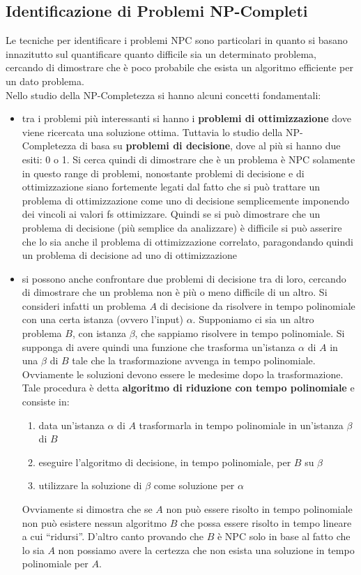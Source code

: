 \documentclass[a4paper,12pt, oneside]{book}
\begin{document}
\subsection{Identificazione di Problemi NP-Completi}
Le tecniche per identificare i problemi NPC sono particolari in quanto
si basano innazitutto sul quantificare quanto difficile sia un
determinato problema, cercando di dimostrare che è poco probabile che
esista un algoritmo efficiente per un dato problema. \\
Nello studio della NP-Completezza si hanno alcuni concetti
fondamentali:
\begin{itemize}
  \item tra i problemi più interessanti si hanno i \textbf{problemi di
    ottimizzazione} dove viene ricercata una soluzione ottima. Tuttavia
  lo studio della NP-Completezza di basa su \textbf{problemi di
    decisione}, dove al più si hanno due esiti: 0 o 1. Si cerca quindi
  di dimostrare che è un problema è NPC solamente in questo range di
  problemi, nonostante problemi di decisione e di ottimizzazione siano
  fortemente legati dal fatto che si può trattare un problema di
  ottimizzazione come uno di decisione semplicemente imponendo dei
  vincoli ai valori fs ottimizzare. Quindi se si può dimostrare che un
  problema di decisione (più semplice da analizzare) è difficile si
  può asserire che lo sia anche il problema di ottimizzazione
  correlato, paragondando quindi un problema di decisione ad uno di
  ottimizzazione 
  \item si possono anche confrontare due problemi di decisione tra di
  loro, cercando di dimostrare che un problema non è più o meno
  difficile di un altro. Si consideri infatti un problema $A$ di
  decisione da risolvere in tempo polinomiale con una certa istanza
  (ovvero l'input) $\alpha$. Supponiamo ci sia un altro problema $B$,
  con istanza $\beta$, che sappiamo risolvere in tempo polinomiale. Si
  supponga di avere quindi una funzione che trasforma un'istanza
  $\alpha$ di $A$ in una $\beta$ di $B$ tale che la trasformazione
  avvenga in tempo polinomiale. Ovviamente le soluzioni devono essere
  le medesime dopo la trasformazione. Tale procedura è detta
  \textbf{algoritmo di riduzione con tempo polinomiale} e consiste in:
  \begin{enumerate}
    \item data un'istanza $\alpha$ di $A$ trasformarla in tempo
    polinomiale in un'istanza $\beta$ di $B$
    \item eseguire l'algoritmo di decisione, in tempo polinomiale, per
    $B$ su $\beta$
    \item utilizzare la soluzione di $\beta$ come soluzione per $\alpha$
  \end{enumerate}
  Ovviamente si dimostra che se $A$ non può essere risolto in tempo
  polinomiale non può esistere nessun algoritmo $B$ che possa essere
  risolto in tempo lineare a cui ``ridursi''. D'altro canto provando
  che $B$ è NPC solo in base al fatto che lo sia $A$ non possiamo
  avere la certezza che non esista una soluzione in tempo polinomiale
  per $A$.
\end{itemize}
\end{document}

